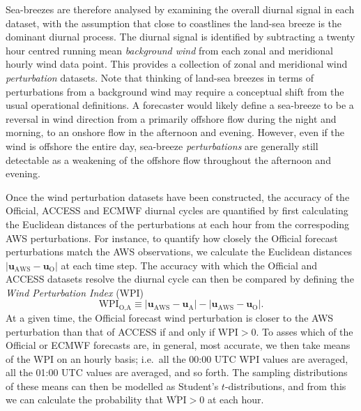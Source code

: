 \documentclass[alpha-refs]{wiley-article}
\begin{document}
Sea-breezes are therefore analysed by examining the overall diurnal signal in each dataset, with the assumption that close to coastlines the land-sea breeze is the dominant diurnal process. The diurnal signal is identified by subtracting a twenty hour centred running mean \textit{background wind} from each zonal and meridional hourly wind data point. This provides a collection of zonal and meridional wind \emph{perturbation} datasets. Note that thinking of land-sea breezes in terms of perturbations from a background wind may require a conceptual shift from the usual operational definitions. A forecaster would likely define a sea-breeze to be a reversal in wind direction from a primarily offshore flow during the night and morning, to an onshore flow in the afternoon and evening. However, even if the wind is offshore the entire day, sea-breeze \emph{perturbations} are generally still detectable as a weakening of the offshore flow throughout the afternoon and evening.

Once the wind perturbation datasets have been constructed, the accuracy of the Official, ACCESS and ECMWF diurnal cycles are quantified by first calculating the Euclidean distances of the perturbations at each hour from the correspoding AWS perturbations. For instance, to quantify how closely the Official forecast perturbations match the AWS observations, we calculate the Euclidean distances $\left\lvert \boldsymbol{u}_{\text{AWS}}-\boldsymbol{u}_{\text{O}} \right\rvert$ at each time step. The accuracy with which the Official and ACCESS datasets resolve the diurnal cycle can then be compared by defining the \textit{Wind Perturbation Index} (WPI) 
\begin{equation}
\text{WPI}_\text{O,A} \equiv \left\lvert \boldsymbol{u}_{\text{AWS}}-\boldsymbol{u}_{\text{A}} \right\rvert - \left\lvert \boldsymbol{u}_{\text{AWS}}-\boldsymbol{u}_{\text{O}} \right\rvert.
\end{equation} 
At a given time, the Official forecast wind perturbation is closer to the AWS perturbation than that of ACCESS if and only if $\text{WPI} > 0$. To asses which of the Official or ECMWF forecasts are, in general, most accurate, we then take means of the WPI on an hourly basis; i.e.~all the 00:00 UTC WPI values are averaged, all the 01:00 UTC values are averaged, and so forth. The sampling distributions of these means can then be modelled as Student's $t$-distributions, and from this we can calculate the probability that $\overline{\text{WPI}} > 0$ at each hour.  
\end{document}
